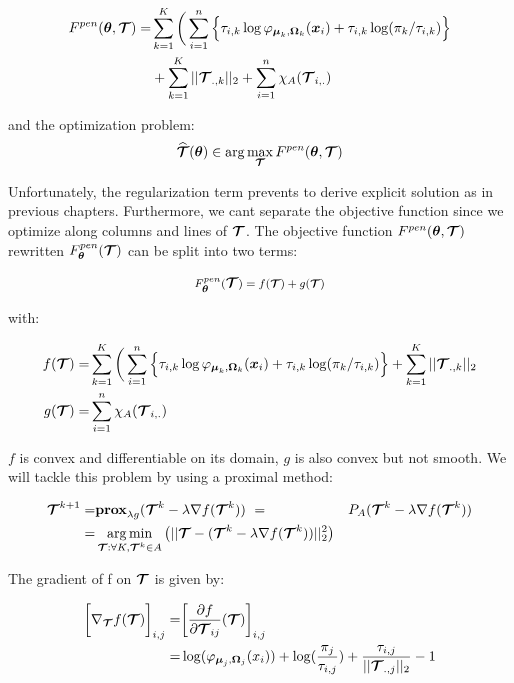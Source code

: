 \begin{align*}
F^{pen}({\boldsymbol\theta},\boldsymbol{\mathcal T})  =& \sum_{k=1}^K \bigg(\sum_{i=1}^{n} \Big\{\tau_{i,k}\log\varphi_{\boldsymbol\mu_{k},\boldsymbol\Omega_{k}}(\boldsymbol x_i)+\tau_{i,k}
    \log(\pi_k/\tau_{i,k})\Big\}\\ 
    &+ \sum_{k=1}^K ||\boldsymbol{\mathcal T}_{.,k}||_{2} + \sum_{i=1}^{n} \chi_A(\boldsymbol{\mathcal T}_{i,.})
\end{align*}

 and the optimization problem:
\begin{equation}
\widehat{\boldsymbol{\mathcal T}}({\boldsymbol\theta})\in \arg\max_{\boldsymbol{\mathcal T}} F^{pen}({\boldsymbol\theta},\boldsymbol{\mathcal T})
\end{equation}

Unfortunately, the regularization term prevents to derive explicit solution as in previous chapters. Furthermore, we cant separate the objective function since we optimize along columns and lines of $\boldsymbol{\mathcal T}$. The objective function $F^{pen}({\boldsymbol\theta},\boldsymbol{\mathcal T})$ rewritten
$F^{pen}_{{\boldsymbol\theta}}(\boldsymbol{\mathcal T})$ can be split into two terms:

\begin{equation}
F^{pen}_{{\boldsymbol\theta}}(\boldsymbol{\mathcal T})={\large f}({\footnotesize
\boldsymbol{\mathcal T}})+ {\large g}({\footnotesize
\boldsymbol{\mathcal T}})
\end{equation}

with:

\begin{align*}
f(\boldsymbol{\mathcal T}) =&   \sum_{k=1}^K \bigg(\sum_{i=1}^{n} \Big\{\tau_{i,k}\log\varphi_{\boldsymbol\mu_{k},\boldsymbol\Omega_{k}}(\boldsymbol x_i)+\tau_{i,k} \log(\pi_k/\tau_{i,k})\Big\} + \sum_{k=1}^K ||\boldsymbol{\mathcal T}_{.,k}||_{2}\\
g(\boldsymbol{\mathcal T}) =& \sum_{i=1}^{n} \chi_A(\boldsymbol{\mathcal T}_{i,.})
\end{align*}

$f$ is convex and differentiable on its domain, $g$ is also convex but not smooth. We will tackle this problem by using a proximal method:

\begin{align*}
  \boldsymbol{\mathcal T}^{k+1} =& {\bf{prox}}_{\lambda g}(\boldsymbol{\mathcal T}^k - \lambda \nabla f(\boldsymbol{\mathcal T}^k))\
      =& P_A(\boldsymbol{\mathcal T}^k - \lambda \nabla f(\boldsymbol{\mathcal T}^k))\\
      =&\operatorname*{arg\,min}_{ \boldsymbol{\mathcal T} : \forall K, \boldsymbol{\mathcal T}^k \in A}\big( || \boldsymbol{\mathcal T} - (\boldsymbol{\mathcal T}^k - \lambda \nabla f(\boldsymbol{\mathcal T}^k) ) ||^2_2 \big)
\end{align*}

The gradient of f on $\boldsymbol{\mathcal T}$ is given by:

\begin{align*}
\bigg[\nabla_{\boldsymbol{\mathcal T}}f(\boldsymbol{\mathcal T})\bigg]_{i,j} =& \bigg[\frac{\partial f}{\partial \boldsymbol{\mathcal T}_{ij}}(\boldsymbol{\mathcal T}) \bigg]_{i,j}\\
=& \log(\varphi_{\boldsymbol\mu_j,\boldsymbol\Omega_j}(x_i))+\log(\frac{\pi_j}{\tau_{i,j}})+\frac{\tau_{i,j}}{||\boldsymbol{\mathcal T}_{.,j}||_2}-1
\end{align*}

